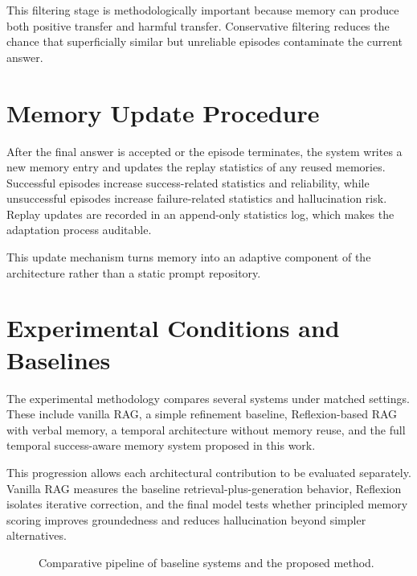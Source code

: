 This filtering stage is methodologically important because memory can produce both positive transfer and harmful transfer. Conservative filtering reduces the chance that superficially similar but unreliable episodes contaminate the current answer.


\section{Memory Update Procedure}
\label{sec:memory-update-procedure}

After the final answer is accepted or the episode terminates, the system writes a new memory entry and updates the replay statistics of any reused memories. Successful episodes increase success-related statistics and reliability, while unsuccessful episodes increase failure-related statistics and hallucination risk. Replay updates are recorded in an append-only statistics log, which makes the adaptation process auditable.

This update mechanism turns memory into an adaptive component of the architecture rather than a static prompt repository.


\section{Experimental Conditions and Baselines}
\label{sec:experimental-conditions-and-baselines}

The experimental methodology compares several systems under matched settings. These include vanilla RAG, a simple refinement baseline, Reflexion-based RAG with verbal memory, a temporal architecture without memory reuse, and the full temporal success-aware memory system proposed in this work.

This progression allows each architectural contribution to be evaluated separately. Vanilla RAG measures the baseline retrieval-plus-generation behavior, Reflexion isolates iterative correction, and the final model tests whether principled memory scoring improves groundedness and reduces hallucination beyond simpler alternatives.

\begin{figure}[H]
    \centering
    
    \caption{Comparative pipeline of baseline systems and the proposed method.}
    \label{fig:comparative-pipeline}
\end{figure}

